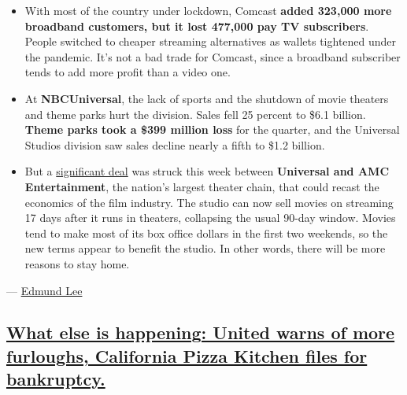 \begin{itemize}
\tightlist
\item
  With most of the country under lockdown, Comcast \textbf{added 323,000
  more broadband customers, but it lost 477,000 pay TV subscribers}.
  People switched to cheaper streaming alternatives as wallets tightened
  under the pandemic. It's not a bad trade for Comcast, since a
  broadband subscriber tends to add more profit than a video one.
\end{itemize}

\begin{itemize}
\tightlist
\item
  At \textbf{NBCUniversal}, the lack of sports and the shutdown of movie
  theaters and theme parks hurt the division. Sales fell 25 percent to
  \$6.1 billion. \textbf{Theme parks took a \$399 million loss} for the
  quarter, and the Universal Studios division saw sales decline nearly a
  fifth to \$1.2 billion.
\end{itemize}

\begin{itemize}
\tightlist
\item
  But a
  \href{https://www.nytimes.com/2020/07/28/business/media/universal-amc-movies-at-home.html}{significant
  deal} was struck this week between \textbf{Universal and AMC
  Entertainment}, the nation's largest theater chain, that could recast
  the economics of the film industry. The studio can now sell movies on
  streaming 17 days after it runs in theaters, collapsing the usual
  90-day window. Movies tend to make most of its box office dollars in
  the first two weekends, so the new terms appear to benefit the studio.
  In other words, there will be more reasons to stay home.
\end{itemize}

--- \href{https://www.nytimes.com/by/edmund-lee}{Edmund Lee}

\hypertarget{what-else-is-happening-united-warns-of-more-furloughs-california-pizza-kitchen-files-for-bankruptcy}{%
\subsection{\texorpdfstring{\protect\hyperlink{what-else-is-happening-united-warns-of-more-furloughs-california-pizza-kitchen-files-for-bankruptcy}{What
else is happening: United warns of more furloughs, California Pizza
Kitchen files for
bankruptcy.}}{What else is happening: United warns of more furloughs, California Pizza Kitchen files for bankruptcy.}}\label{what-else-is-happening-united-warns-of-more-furloughs-california-pizza-kitchen-files-for-bankruptcy}}

